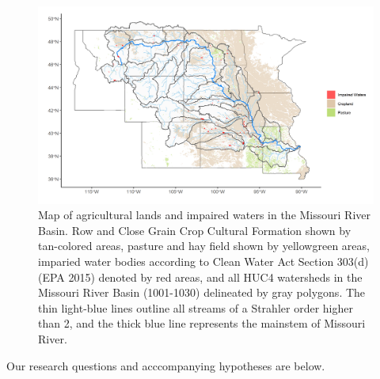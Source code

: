 \documentclass[12pt,]{article}
\makeatletter
\def\maxwidth{\ifdim\Gin@nat@width>\linewidth\linewidth\else\Gin@nat@width\fi}
\makeatother
\begin{document}
\begin{figure}[H]
\includegraphics[width=\maxwidth]{../Figures/cropland3} \caption{\label{fig:cropland} Map of agricultural lands and impaired waters in the Missouri River Basin. Row and Close Grain Crop Cultural Formation shown by tan-colored areas, pasture and hay field shown by yellowgreen areas, imparied water bodies according to Clean Water Act Section 303(d) (EPA 2015) denoted by red areas, and all HUC4 watersheds in the Missouri River Basin (1001-1030) delineated by gray polygons. The thin light-blue lines outline all streams of a Strahler order higher than 2, and the thick blue line represents the mainstem of Missouri River.}\label{fig:cropland}
\end{figure}

Our research questions and acccompanying hypotheses are below.
\end{document}
